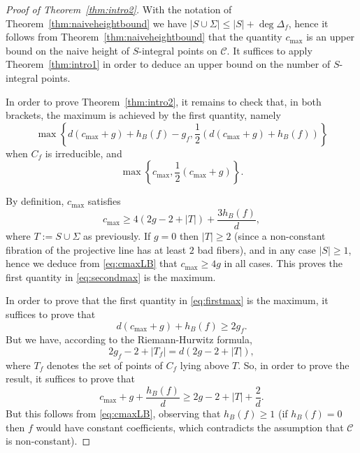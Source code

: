 \documentclass[11pt]{article}
\theoremstyle{plain}
\theoremstyle{definition}
\begin{document}
\begin{proof}[Proof of Theorem~\ref{thm:intro2}]
With the notation of Theorem~\ref{thm:naiveheightbound} we have $|S\cup \Sigma|\leq |S|+\deg \Delta_f$, hence it follows from Theorem~\ref{thm:naiveheightbound} that the quantity $c_{\max}$ is an upper bound on the naive height of $S$-integral points on $\mathcal{C}$. It suffices to apply Theorem~\ref{thm:intro1} in order to deduce an upper bound on the number of $S$-integral points.

In order to prove Theorem~\ref{thm:intro2}, it remains to check that, in both brackets, the maximum is achieved by the first quantity, namely
\begin{equation}
\label{eq:firstmax}
\max\left\{d(c_{\max}+g)+h_B(f)-g_f, \frac{1}{2}\left(d(c_{\max}+g)+h_B(f)\right)\right\}
\end{equation}
when $C_f$ is irreducible, and
\begin{equation}
\label{eq:secondmax}
\max\left\{c_{\max}, \frac{1}{2}(c_{\max}+g)\right\}.
\end{equation}

By definition, $c_{\max}$ satisfies
\begin{equation}
\label{eq:cmaxLB}
c_{\max} \geq 4(2g - 2 + |T|) + \frac{3h_B(f)}{d},
\end{equation}
where $T := S\cup\Sigma$ as previously. If $g=0$ then $|T| \geq 2$ (since a non-constant fibration of the projective line has at least $2$ bad fibers), and in any case $|S|\geq 1$, hence we deduce from \eqref{eq:cmaxLB} that $c_{\max} \geq 4g$ in all cases. This proves the first quantity in \eqref{eq:secondmax} is the maximum.

In order to prove that the first quantity in \eqref{eq:firstmax} is the maximum, it suffices to prove that
$$
d(c_{\max}+g)+h_B(f) \geq 2g_f.
$$
But we have, according to the Riemann-Hurwitz formula,
$$
2g_f-2+|T_f| = d(2g-2+|T|),
$$
where $T_f$ denotes the set of points of $C_f$ lying above $T$. So, in order to prove the result, it suffices to prove that
$$
c_{\max}+g+\frac{h_B(f)}{d} \geq 2g-2+|T| + \frac{2}{d}.
$$
But this follows from \eqref{eq:cmaxLB}, observing that $h_B(f)\geq 1$ (if $h_B(f)=0$ then $f$ would have constant coefficients, which contradicts the assumption that $\mathcal{C}$ is non-constant).
\end{proof}



\end{document}
